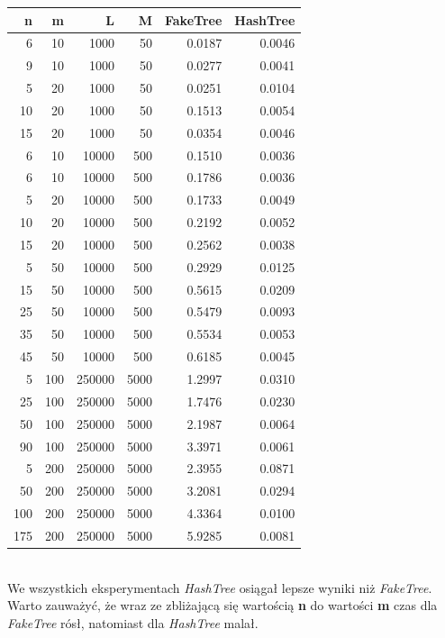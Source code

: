 \documentclass[a4paper,12pt]{article}
\begin{document}
\begin{tabular}{|r|r|r|r|r|r|}
\hline
n & m & L & M & FakeTree & HashTree \\ \hline
6 & 10 & 1000 & 50 & 0.0187 & 0.0046\\ \hline
9 & 10 & 1000 & 50 & 0.0277 & 0.0041\\ \hline
5 & 20 & 1000 & 50 & 0.0251 & 0.0104\\ \hline
10 & 20 & 1000 & 50 & 0.1513 & 0.0054\\ \hline
15 & 20 & 1000 & 50 & 0.0354 & 0.0046\\ \hline
6 & 10 & 10000 & 500 & 0.1510 & 0.0036\\ \hline
6 & 10 & 10000 & 500 & 0.1786 & 0.0036\\ \hline
5 & 20 & 10000 & 500 & 0.1733 & 0.0049\\ \hline
10 & 20 & 10000 & 500 & 0.2192 & 0.0052\\ \hline
15 & 20 & 10000 & 500 & 0.2562 & 0.0038\\ \hline
5 & 50 & 10000 & 500 & 0.2929 & 0.0125\\ \hline
15 & 50 & 10000 & 500 & 0.5615 & 0.0209\\ \hline
25 & 50 & 10000 & 500 & 0.5479 & 0.0093\\ \hline
35 & 50 & 10000 & 500 & 0.5534 & 0.0053\\ \hline
45 & 50 & 10000 & 500 & 0.6185 & 0.0045\\ \hline
5 & 100 & 250000 & 5000 & 1.2997 & 0.0310\\ \hline
25 & 100 & 250000 & 5000 & 1.7476 & 0.0230\\ \hline
50 & 100 & 250000 & 5000 & 2.1987 & 0.0064\\ \hline
90 & 100 & 250000 & 5000 & 3.3971 & 0.0061\\ \hline
5 & 200 & 250000 & 5000 & 2.3955 & 0.0871\\ \hline
50 & 200 & 250000 & 5000 & 3.2081 & 0.0294\\ \hline
100 & 200 & 250000 & 5000 & 4.3364 & 0.0100\\ \hline
175 & 200 & 250000 & 5000 & 5.9285 & 0.0081\\ \hline
\end{tabular}
\\

We wszystkich eksperymentach \textit{HashTree} osiągał lepsze wyniki niż \textit{FakeTree}. Warto zauważyć, że wraz ze zbliżającą się wartością {\bf n} do wartości {\bf m} czas dla \textit{FakeTree} rósł, natomiast dla \textit{HashTree} malał.
\end{document}
